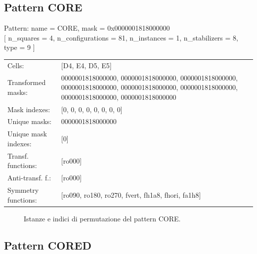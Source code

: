 \subsection{Pattern CORE}

\begin{tcolorbox}[sharp corners, fontupper=\ttfamily\small, colback=white]
  \noindent Pattern: name = CORE, mask = 0x0000001818000000\\
  {[} n\_squares = 4, n\_configurations = 81,
  n\_instances = 1, n\_stabilizers = 8, type = 9 { ]}\\[1.0ex]
  \begin{tabularx}{\textwidth}{@{} p{3.5cm} X @{}}
    Cells:               & {[}D4, E4, D5, E5{]}\\[0.5ex]
    Transformed masks:   & 0000001818000000, 0000001818000000, 0000001818000000, 0000001818000000, 0000001818000000, 0000001818000000, 0000001818000000, 0000001818000000\\[0.5ex]
    Mask indexes:        & {[}0, 0, 0, 0, 0, 0, 0, 0{]}\\[0.5ex]
    Unique masks:        & 0000001818000000\\[0.5ex]
    Unique mask indexes: & {[}0{]}\\[0.5ex]
    Transf. functions:   & {[}ro000{]}\\[0.5ex]
    Anti-transf. f.:     & {[}ro000{]}\\[0.5ex]
    Symmetry functions:  & {[}ro090, ro180, ro270, fvert, fh1a8, fhori, fa1h8{]}\\[0.5ex]
  \end{tabularx}
\end{tcolorbox}

\begin{figure}[htbp]
  \centering
   \hfill
   \hfill
   \hfill
  \vspace{0.3cm}
   \hfill
   \hfill
   \hfill
  \caption{Istanze e indici di permutazione del pattern CORE.}
\end{figure}

\newpage

\subsection{Pattern CORED}

